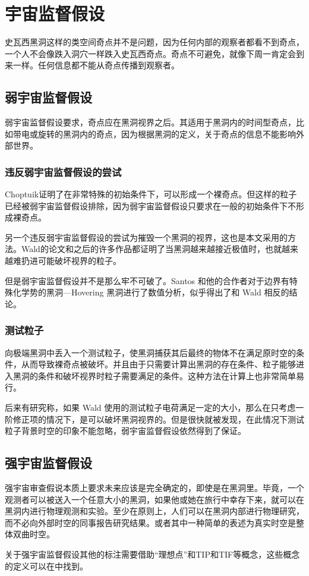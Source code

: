 \chapter{宇宙监督假设}
史瓦西黑洞这样的类空间奇点并不是问题，因为任何内部的观察者都看不到奇点，一个人不会像跌入洞穴一样跌入史瓦西奇点。奇点不可避免，就像下周一肯定会到来一样。任何信息都不能从奇点传播到观察者。
\section{弱宇宙监督假设}
弱宇宙监督假设要求，奇点应在黑洞视界之后。其适用于黑洞内的时间型奇点，比如带电或旋转的黑洞内的奇点，因为根据黑洞的定义，关于奇点的信息不能影响外部世界。
\subsection{违反弱宇宙监督假设的尝试}
Choptuik证明了在非常特殊的初始条件下\citep{choptuik1993universality}，可以形成一个裸奇点。但这样的粒子已经被弱宇宙监督假设排除，因为弱宇宙监督假设只要求在一般的初始条件下不形成裸奇点。

另一个违反弱宇宙监督假设的尝试为摧毁一个黑洞的视界，这也是本文采用的方法。Wald的论文\citep{wald1974gedanken}和之后的许多作品都证明了当黑洞越来越接近极值时，也就越来越难扔进可能破坏视界的粒子。

但是弱宇宙监督假设并不是那么牢不可破了。Santos 和他的合作者对于边界有特殊化学势的黑洞—Hovering 黑洞进行了数值分析\citep{horowitz2015hovering,crisford2017violating}，似乎得出了和 Wald 相反的结论。
\subsection{测试粒子}
向极端黑洞中丢入一个测试粒子，使黑洞捕获其后最终的物体不在满足原时空的条件，从而导致裸奇点被破坏。并且由于只需要计算出黑洞的存在条件、粒子能够进入黑洞的条件和破坏视界时粒子需要满足的条件。这种方法在计算上也非常简单易行。

后来有研究称，如果 Wald 使用的测试粒子电荷满足一定的大小，那么在只考虑一阶修正项的情况下，是可以破坏黑洞视界的\citep{hubeny1999overcharging}。但是很快就被发现，在此情况下测试粒子背景时空的印象不能忽略\citep{hod2002cosmic,barausse2010test,colleoni2015overspinning,wald2018kerr,sorce2017gedanken}，弱宇宙监督假设依然得到了保证。

\section{强宇宙监督假设}
强宇宙审查假说本质上要求未来应该是完全确定的，即使是在黑洞里。毕竟，一个观测者可以被送入一个任意大小的黑洞，如果他或她在旅行中幸存下来，就可以在黑洞内进行物理观测和实验。至少在原则上，人们可以在黑洞内部进行物理研究，而不必向外部时空的同事报告研究结果\citep{ong2020space}。或者其中一种简单的表述为真实时空是整体双曲时空。

关于强宇宙监督假设其他的标注需要借助“理想点”和TIP和TIF等概念，这些概念的定义可以在\citep{梁灿彬2006微分几何入门与广义相对论}中找到。
